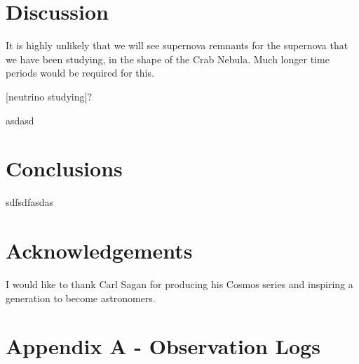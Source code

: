 \documentclass[twocolumn]{revtex4}
\begin{document}
\vspace{-3ex}
\section{Discussion}
\vspace{-2ex}

It is highly unlikely that we will see supernova remnants for the supernova that we have been studying, in the shape of the Crab Nebula. Much longer time periods would be required for this. 

[neutrino studying]?

asdasd

\vspace{-5ex}
\section{Conclusions}
\vspace{-2ex}

sdfsdfasdas

\vspace{-5ex}
\section*{Acknowledgements}
\vspace{-2ex}

I would like to thank Carl Sagan for producing his Cosmos series and inspiring a generation to become astronomers.




\clearpage




\vfill
\twocolumngrid
\vspace{-3ex}
\section*{Appendix A - Observation Logs}
\vspace{-2ex}



\clearpage
\end{document}
